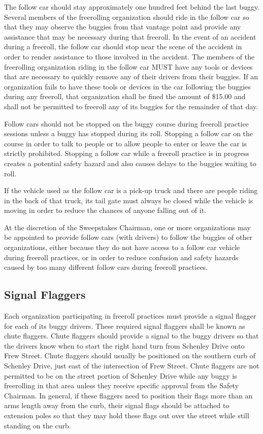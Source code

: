 	The follow car should stay approximately one hundred feet behind the last
	buggy. Several members of the freerolling organization should ride in the
	follow car so that they may observe the buggies from that vantage point and
	provide any assistance that may be necessary during that freeroll. In the event
	of an accident during a freeroll, the follow car should stop near the scene of
	the accident in order to render assistance to those involved in the accident.
	The members of the freerolling organization riding in the follow car MUST have
	any tools or devices that are necessary to quickly remove any of their drivers
	from their buggies. If an organization fails to have these tools or devices in
	the car following the buggies during any freeroll, that organization shall be
	fined the amount of \$15.00 and shall not be permitted to freeroll any of its
	buggies for the remainder of that day.

	Follow cars should not be stopped on the buggy course during freeroll practice
	sessions unless a buggy has stopped during its roll. Stopping a follow car on
	the course in order to talk to people or to allow people to enter or leave the
	car is strictly prohibited. Stopping a follow car while a freeroll practice is
	in progress creates a potential safety hazard and also causes delays to the
	buggies waiting to roll.

	If the vehicle used as the follow car is a pick-up truck and there are people
	riding in the back of that truck, its tail gate must always be closed while the
	vehicle is moving in order to reduce the chances of anyone falling out of it.

	At the discretion of the Sweepstakes Chairman, one or more organizations may be
	appointed to provide follow cars (with drivers) to follow the buggies of other
	organizations, either because they do not have access to a follow car vehicle
	during freeroll practices, or in order to reduce confusion and safety hazards
	caused by too many different follow cars during freeroll practices.
 
\subsection{Signal Flaggers}

	Each organization participating in freeroll practices must provide a signal
	flagger for each of its buggy drivers. These required signal flaggers shall be
	known as chute flaggers. Chute flaggers should provide a signal to the buggy
	drivers so that the drivers know when to start the right hand turn from
	Schenley Drive onto Frew Street. Chute flaggers should usually be positioned on
	the southern curb of Schenley Drive, just east of the intersection of Frew
	Street. Chute flaggers are not permitted to be on the street portion of
	Schenley Drive while any buggy is freerolling in that area unless they receive
	specific approval from the Safety Chairman. In general, if these flaggers need
	to position their flags more than an arms length away from the curb, their
	signal flags should be attached to extension poles so that they may hold these
	flags out over the street while still standing on the curb.


